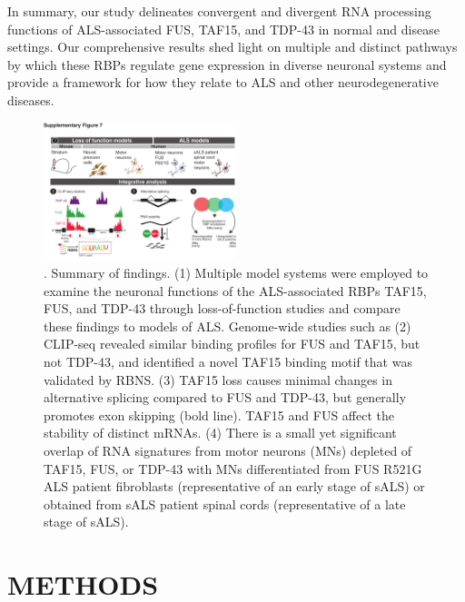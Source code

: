 In summary, our study delineates convergent and divergent RNA processing functions of ALS-associated FUS, TAF15, and TDP-43 in normal and disease settings. Our comprehensive results shed light on multiple and distinct pathways by which these RBPs regulate gene expression in diverse neuronal systems and provide a framework for how they relate to ALS and other neurodegenerative diseases.

\begin{figure}[ht]
  \centering
  \includegraphics[width=0.5\textwidth]{chapter_2_figures/Figure_S7}
  \caption[Supplementary Figure 7]{. Summary of findings. (1) Multiple model systems were employed to examine the neuronal functions of the ALS-associated RBPs TAF15, FUS, and TDP-43 through loss-of-function studies and compare these findings to models of ALS. Genome-wide studies such as (2) CLIP-seq revealed similar binding profiles for FUS and TAF15, but not TDP-43, and identified a novel TAF15 binding motif that was validated by RBNS. (3) TAF15 loss causes minimal changes in alternative splicing compared to FUS and TDP-43, but generally promotes exon skipping (bold line). TAF15 and FUS affect the stability of distinct mRNAs. (4) There is a small yet significant overlap of RNA signatures from motor neurons (MNs) depleted of TAF15, FUS, or TDP-43 with MNs differentiated from FUS R521G ALS patient fibroblasts (representative of an early stage of sALS) or obtained from sALS patient spinal cords (representative of a late stage of sALS).}
  \label{fig:Figure_S7}
\end{figure}

\section{METHODS}

